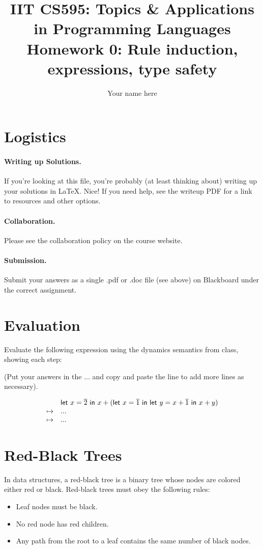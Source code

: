 \documentclass{article}
\title{IIT CS595: Topics \& Applications in Programming Languages\\
  {\large Homework 0: Rule induction, expressions, type safety}}
\author{Your name here}
\begin{document}
\maketitle

\section{Logistics}

\paragraph{Writing up Solutions.}
If you're looking at this file, you're probably (at least thinking about)
writing up your solutions in LaTeX. Nice! If you need help, see the writeup
PDF for a link to resources and other options.

\paragraph{Collaboration.}
Please see the collaboration policy on the course website.

\paragraph{Submission.}
Submit your answers as a single .pdf or .doc file (see above) on Blackboard
under
the correct assignment. 


\section{Evaluation}
\begin{task}
  Evaluate the following expression using the dynamics semantics from class,
  showing each step:

  (Put your answers in the ... and copy and paste the line to add more lines
  as necessary).
  
  \[
  \begin{array}{l l}
    &
    \mathsf{let}~x=\overline{2}~\mathsf{in}~x+(\mathsf{let}~x=\overline{1}~\mathsf{in}~\mathsf{let}~y=x+\overline{1}~\mathsf{in}~x+y)\\
    \mapsto & ...\\
    \mapsto & ...\\
  \end{array}
  \]
\end{task}

\section{Red-Black Trees}
In data structures, a red-black tree is a binary tree whose nodes are colored
either red or black.
%
Red-black trees must obey the following rules:
\begin{itemize}
\item Leaf nodes must be black.
\item No red node has red children.
\item Any path from the root to a leaf contains the same number of black nodes.
\end{itemize}
\end{document}

